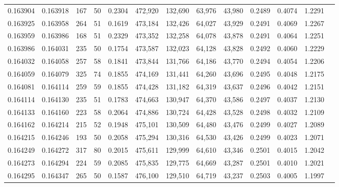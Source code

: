 \begin{tabular}{rrrrrrrrrrrrr}
0.163904 & 0.163918 &   167 &  50 &                                     0.2304 & 472,920 & 132,690 &  63,976 &  43,980 & 0.2489 & 0.4074 & 1.2291 \\
0.163925 & 0.163958 &   264 &  51 &                                     0.1619 & 473,184 & 132,426 &  64,027 &  43,929 & 0.2491 & 0.4069 & 1.2267 \\
0.163959 & 0.163986 &   168 &  51 &                                     0.2329 & 473,352 & 132,258 &  64,078 &  43,878 & 0.2491 & 0.4064 & 1.2251 \\
0.163986 & 0.164031 &   235 &  50 &                                     0.1754 & 473,587 & 132,023 &  64,128 &  43,828 & 0.2492 & 0.4060 & 1.2229 \\
0.164032 & 0.164058 &   257 &  58 &                                     0.1841 & 473,844 & 131,766 &  64,186 &  43,770 & 0.2494 & 0.4054 & 1.2206 \\
0.164059 & 0.164079 &   325 &  74 &                                     0.1855 & 474,169 & 131,441 &  64,260 &  43,696 & 0.2495 & 0.4048 & 1.2175 \\
0.164081 & 0.164114 &   259 &  59 &                                     0.1855 & 474,428 & 131,182 &  64,319 &  43,637 & 0.2496 & 0.4042 & 1.2151 \\
0.164114 & 0.164130 &   235 &  51 &                                     0.1783 & 474,663 & 130,947 &  64,370 &  43,586 & 0.2497 & 0.4037 & 1.2130 \\
0.164133 & 0.164160 &   223 &  58 &                                     0.2064 & 474,886 & 130,724 &  64,428 &  43,528 & 0.2498 & 0.4032 & 1.2109 \\
0.164162 & 0.164214 &   215 &  52 &                                     0.1948 & 475,101 & 130,509 &  64,480 &  43,476 & 0.2499 & 0.4027 & 1.2089 \\
0.164215 & 0.164246 &   193 &  50 &                                     0.2058 & 475,294 & 130,316 &  64,530 &  43,426 & 0.2499 & 0.4023 & 1.2071 \\
0.164249 & 0.164272 &   317 &  80 &                                     0.2015 & 475,611 & 129,999 &  64,610 &  43,346 & 0.2501 & 0.4015 & 1.2042 \\
0.164273 & 0.164294 &   224 &  59 &                                     0.2085 & 475,835 & 129,775 &  64,669 &  43,287 & 0.2501 & 0.4010 & 1.2021 \\
0.164295 & 0.164347 &   265 &  50 &                                     0.1587 & 476,100 & 129,510 &  64,719 &  43,237 & 0.2503 & 0.4005 & 1.1997 \\

\end{tabular}

